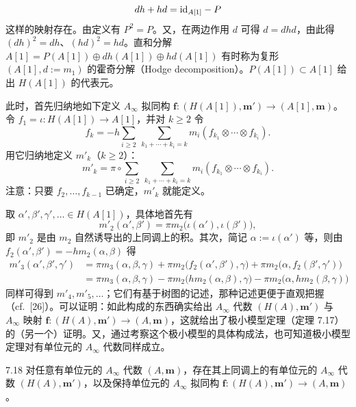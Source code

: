 
\[
  dh+hd=\mathrm{id}_{A[1]}-P
\]
这样的映射存在。由定义有 $P^{2}=P$。又，在两边作用 $d$ 可得 $d=dhd$，由此得 $(dh)^{2}=dh$、$(hd)^{2}=hd$。直和分解 $A[1]=P(A[1])\oplus dh(A[1])\oplus hd(A[1])$ 有时称为复形 $(A[1],d:=m_{1})$ 的霍奇分解（Hodge decomposition）。$P(A[1])\subset A[1]$ 给出 $H(A[1])$ 的代表元。

此时，首先归纳地如下定义 $A_\infty$ 拟同构 $\mathbf f\colon(H(A[1]),\mathbf m')\to(A[1],\mathbf m)$。令 $f_{1}=\iota\colon H(A[1])\to A[1]$，并对 $k\ge 2$ 令
\[
  f_{k}=-h\sum_{i\ge 2}\ \sum_{k_{1}+\cdots+k_{i}=k}m_{i}(f_{k_{1}}\otimes\cdots\otimes f_{k_{i}}).
\]
用它归纳地定义 $m'_{k}$（$k\ge 2$）：
\[
  m'_{k}=\pi\circ\sum_{i\ge 2}\ \sum_{k_{1}+\cdots+k_{i}=k}m_{i}(f_{k_{1}}\otimes\cdots\otimes f_{k_{i}}).
\]
注意：只要 $f_{2},\dots,f_{k-1}$ 已确定，$m'_{k}$ 就能定义。

取 $\alpha',\beta',\gamma',\dots\in H(A[1])$，具体地首先有
\[
  m'_{2}(\alpha',\beta')=\pi m_{2}\bigl(\iota(\alpha'),\iota(\beta')\bigr),
\]
即 $m'_{2}$ 是由 $m_{2}$ 自然诱导出的上同调上的积。其次，简记 $\alpha:=\iota(\alpha')$ 等，则由 $f_{2}(\alpha',\beta')=-h m_{2}(\alpha,\beta)$ 得
\begin{align*}
  m'_{3}(\alpha',\beta',\gamma')&=\pi m_{3}(\alpha,\beta,\gamma)+\pi m_{2}\bigl(f_{2}(\alpha',\beta'),\gamma\bigr)+\pi m_{2}\bigl(\alpha,f_{2}(\beta',\gamma')\bigr)\\
  &=\pi m_{3}(\alpha,\beta,\gamma)-\pi m_{2}\bigl(h m_{2}(\alpha,\beta),\gamma\bigr)-\pi m_{2}\bigl(\alpha,h m_{2}(\beta,\gamma)\bigr)
\end{align*}
同样可得到 $m'_{4},m'_{5},\dots$；它们有基于树图的记述，那种记述更便于直观把握（cf.\ [26]）。可以证明：如此构成的东西确实给出 $A_\infty$ 代数 $(H(A),\mathbf m')$ 与 $A_\infty$ 映射 $\mathbf f\colon(H(A),\mathbf m')\to(A,\mathbf m)$，这就给出了极小模型定理（定理 7.17）的（另一个）证明。又，通过考察这个极小模型的具体构成法，也可知道极小模型定理对有单位元的 $A_\infty$ 代数同样成立。

\begin{theorem}{7.18}
对任意有单位元的 $A_\infty$ 代数 $(A,\mathbf m)$，存在其上同调上的有单位元的 $A_\infty$ 代数 $(H(A),\mathbf m')$，以及保持单位元的 $A_\infty$ 拟同构 $\mathbf f\colon(H(A),\mathbf m')\to(A,\mathbf m)$。
\end{theorem}

